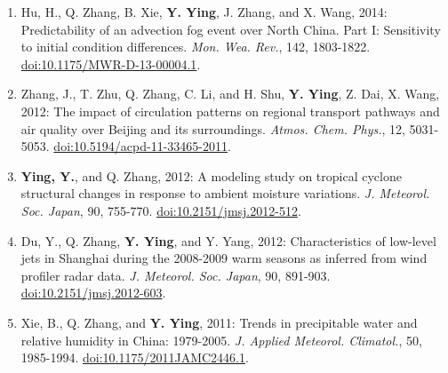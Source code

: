 \begin{enumerate}
\item Hu, H., Q. Zhang, B. Xie, \textbf{Y. Ying}, J. Zhang, and X. Wang, 2014: Predictability of an advection fog event over North China. Part I: Sensitivity to initial condition differences. 
\textit{Mon. Wea. Rev.}, 142, 1803-1822. 
\href{https://doi.org/10.1175/MWR-D-13-00004.1}{doi:10.1175/MWR-D-13-00004.1}.

\item Zhang, J., T. Zhu, Q. Zhang, C. Li, and H. Shu, \textbf{Y. Ying}, Z. Dai, X. Wang, 2012: The impact of circulation patterns on regional transport pathways and air quality over Beijing and its surroundings. 
\textit{Atmos. Chem. Phys.}, 12, 5031-5053. 
\href{https://doi.org/10.5194/acpd-11-33465-2011}{doi:10.5194/acpd-11-33465-2011}.

\item \textbf{Ying, Y.}, and Q. Zhang, 2012: A modeling study on tropical cyclone structural changes in response to ambient moisture variations. 
\textit{J. Meteorol. Soc. Japan}, 90, 755-770. 
\href{https://doi.org/10.2151/jmsj.2012-512}{doi:10.2151/jmsj.2012-512}.

\item Du, Y., Q. Zhang, \textbf{Y. Ying}, and Y. Yang, 2012: Characteristics of low-level jets in Shanghai during the 2008-2009 warm seasons as inferred from wind profiler radar data. 
\textit{J. Meteorol. Soc. Japan}, 90, 891-903. 
\href{https://doi.org/10.2151/jmsj.2012-603}{doi:10.2151/jmsj.2012-603}.

\item Xie, B., Q. Zhang, and \textbf{Y. Ying}, 2011: Trends in precipitable water and relative humidity in China: 1979-2005. 
\textit{J. Applied Meteorol. Climatol.}, 50, 1985-1994. 
\href{https://doi.org/10.1175/2011JAMC2446.1}{doi:10.1175/2011JAMC2446.1}.

\end{enumerate}
